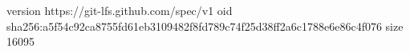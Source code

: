 version https://git-lfs.github.com/spec/v1
oid sha256:a5f54c92ca8755fd61eb3109482f8fd789c74f25d38ff2a6c1788e6e86c4f076
size 16095
